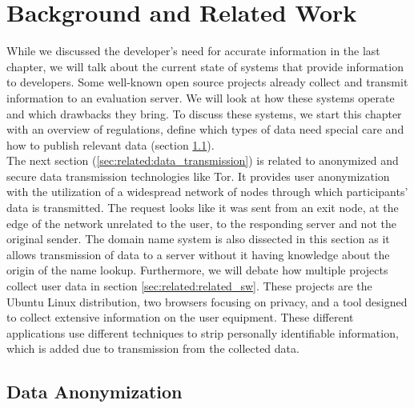 \chapter{Background and Related Work}
\label{chap:related_work}
%

While we discussed the developer's need for accurate information in the last chapter, we will talk about the current state of systems that provide information to developers. Some well-known open source projects already collect and transmit information to an evaluation server. We will look at how these systems operate and which drawbacks they bring.
To discuss these systems, we start this chapter with an overview of regulations, define which types of data need special care and how to publish relevant data (section \ref{sec:related:data_aononymization}).\\ 
The next section (\ref{sec:related:data_transmission}) is related to anonymized and secure data transmission technologies like Tor. It provides user anonymization with the utilization of a widespread network of nodes through which participants' data is transmitted. The request looks like it was sent from an exit node, at the edge of the network unrelated to the user, to the responding server and not the original sender. The domain name system is also dissected in this section as it allows transmission of data to a server without it having knowledge about the origin of the name lookup.
Furthermore, we will debate how multiple projects collect user data in section \ref{sec:related:related_sw}. These projects are the Ubuntu Linux distribution, two browsers focusing on privacy, and a tool designed to collect extensive information on the user equipment.
These different applications use different techniques to strip personally identifiable information, which is added due to transmission from the collected data.

\newpage

\section{Data Anonymization}
    \label{sec:related:data_aononymization}
    
